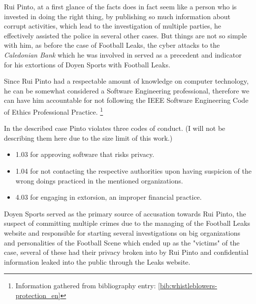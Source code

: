 Rui Pinto, at a first glance of the facts does in fact seem like a person who is invested in doing the right thing, by publishing so much information about corrupt activities, which lead to the investigation of multiple parties, he effectively assisted the police in several other cases.
But things are not so simple with him, as before the case of Football Leaks, the cyber attacks to the \textit{Caledonian Bank} which he was involved in served as a precedent and indicator for his extortions of Doyen Sports with Football Leaks.


Since Rui Pinto had a respectable amount of knowledge on computer technology, he can be somewhat considered a Software Engineering professional, therefore we can have him accountable for not following the IEEE Software Engineering Code of Ethics Professional Practice.
\footnote{Information gathered from bibliography entry: \ref{bib:whistleblowers-protection_en}}

In the described case Pinto violates three codes of conduct.
(I will not be describing them here due to the size limit of this work.)
\begin{itemize}
    \item 1.03 for approving software that risks privacy.
    \item 1.04 for not contacting the respective authorities upon having suspicion of the wrong doings practiced in the mentioned organizations.
    \item 4.03 for engaging in extorsion, an improper financial practice.
\end{itemize}

Doyen Sports served as the primary source of accusation towards Rui Pinto, the suspect of committing multiple crimes due to the managing of the Football Leaks website and responsible for starting several investigations on big organizations and personalities of the Football Scene which ended up as the "victims" of the case, several of these had their privacy broken into by Rui Pinto and confidential information leaked into the public through the Leaks website.

